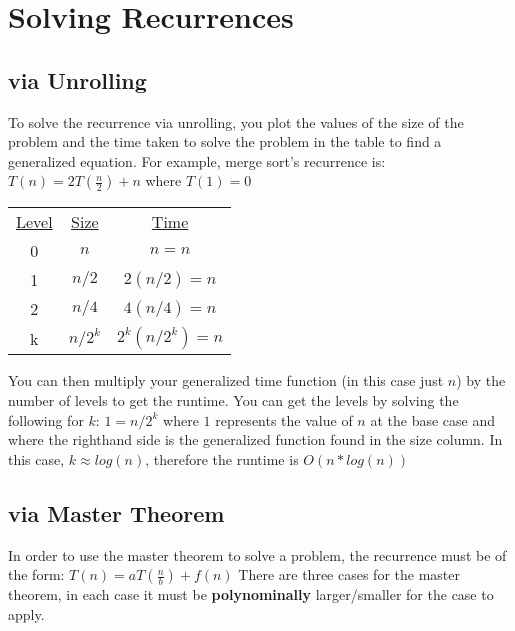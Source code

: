 \documentclass{article}
\begin{document}











\section{Solving Recurrences}
\subsection{via Unrolling}
To solve the recurrence via unrolling, you plot the values of the size of the problem and
the time taken to solve the problem in the table to find a generalized equation. For example,
merge sort's recurrence is: $T(n) = 2T(\frac{n}{2}) + n$ where $T(1) = 0$

\begin{center}
    \begin{tabular}{c c c}
        \underline{Level} & \underline{Size} & \underline{Time} \\
        0 & $n$ & $n = n$ \\
        1 & $n/2$ & $2(n/2) = n$ \\
        2 & $n/4$ & $4(n/4) = n$ \\
        k & $n/2^k$ & $2^k(n/2^k) = n$ \\
    \end{tabular}
\end{center}

You can then multiply your generalized time function (in this case just $n$) by the number of levels
to get the runtime. You can get the levels by solving the following for $k$: $1 = n/2^k$ where $1$ represents the value of $n$
at the base case and where the righthand side is the generalized function found in the size column.
In this case, $k \approx log(n)$, therefore the runtime is $O(n*log(n))$


\subsection{via Master Theorem}
In order to use the master theorem to solve a problem, the recurrence must be of the form:
$T(n) = aT(\frac{n}{b})+f(n)$
There are three cases for the master theorem, in each case it must be \textbf{polynominally} larger/smaller for the case to apply.
\end{document}
